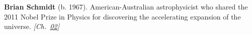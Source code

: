\nobelphysics \textbf{Brian Schmidt} (b. 1967). American-Australian astrophysicist who shared the 2011 Nobel Prize in Physics for discovering the accelerating expansion of the universe. \emph{[Ch.~\hyperref[ch:acceleratinguniverse]{02}]}

